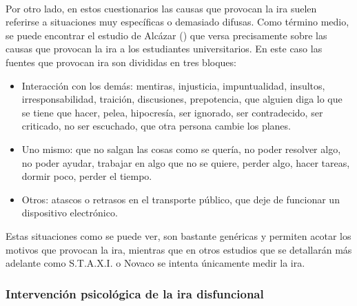 \paragraph{}
Por otro lado, en estos cuestionarios las causas que provocan la ira suelen referirse a situaciones muy específicas o demasiado difusas. Como término medio, se puede encontrar el estudio de Alcázar (\citeyear{alcazar2015que}) que versa precisamente sobre las causas que provocan la ira a los estudiantes universitarios. En este caso las fuentes que provocan ira son divididas en tres bloques:
\begin{itemize}
\item Interacción con los demás: mentiras, injusticia, impuntualidad, insultos, irresponsabilidad, traición, discusiones, prepotencia, que alguien diga lo que se tiene que hacer, pelea, hipocresía, ser ignorado, ser contradecido, ser criticado, no ser escuchado, que otra persona cambie los planes.
\item Uno mismo: que no salgan las cosas como se quería, no poder resolver algo, no poder ayudar, trabajar en algo que no se quiere, perder algo, hacer tareas, dormir poco, perder el tiempo.
\item Otros: atascos o retrasos en el transporte público, que deje de funcionar un dispositivo electrónico.
\end{itemize}

Estas situaciones como se puede ver, son bastante genéricas y permiten acotar los motivos que provocan la ira, mientras que en otros estudios que se detallarán más adelante como S.T.A.X.I. o Novaco se intenta únicamente medir la ira.

\subsubsection{Intervención psicológica de la ira disfuncional}
\label{subsubsec:intervencionPsico}


